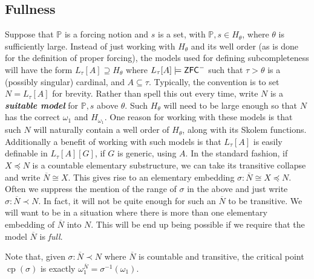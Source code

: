 \documentclass{amsart}
\theoremstyle{definition}
\theoremstyle{remark}
\renewcommand{\P}{\mathbb{P}}
\newcommand{\N}{{\overline{N}}}
\newcommand{\ZFC}{\textup{\ensuremath{\textsf{ZFC}}}}
\DeclareMathOperator{\cp}{cp}
\begin{document}
\subsection{Fullness}
\label{subsec:fullness}
Suppose that $\P$ is a forcing notion and $s$ is a set, with $\P, s \in H_\theta$, where $\theta$ is sufficiently large. Instead of just working with $H_\theta$ and its well order (as is done for the definition of proper forcing), the models used for defining subcompleteness will have the form $L_\tau[A] \supseteq H_\theta$ where $L_\tau[A] \models \ZFC^-$ such that $\tau>\theta$ is a (possibly singular) cardinal, and $A \subseteq \tau$. Typically, the convention is to set $N=L_\tau[A]$ for brevity. Rather than spell this out every time, write $N$ is a \emph{\textbf{suitable model}} for $\P,s$ above $\theta$.
Such $H_\theta$ will need to be large enough so that $N$ has the correct $\omega_1$ and $H_{\omega_1}$. One reason for working with these models is that such $N$ will naturally contain a well order of $H_\theta$, along with its Skolem functions. Additionally a benefit of working with such models is that $L_\tau[A]$ is easily definable in $L_\tau[A][G]$, if $G$ is generic, using $A$.
In the standard fashion, if $X \preccurlyeq N$ is a countable elementary substructure, we can take its transitive collapse and write $\N \cong X$. This gives rise to an elementary embedding 
$\sigma: \N \cong X \preccurlyeq N.$
Often we suppress the mention of the range of $\sigma$ in the above and just write $\sigma: \N \prec N$.
In fact, it will not be quite enough for such an $\N$ to be transitive. We will want to be in a
situation where there is more than one elementary embedding of \(\N\) into \(N\).
This will be end up being possible if we require that the model \(\N\) is \emph{full}.

Note that, given $\sigma: \N \prec N$ where $\N$ is countable and transitive, the critical point $\cp(\sigma)$ is exactly $\omega_1^{\N} = \sigma^{-1}(\omega_1)$.
\end{document}
